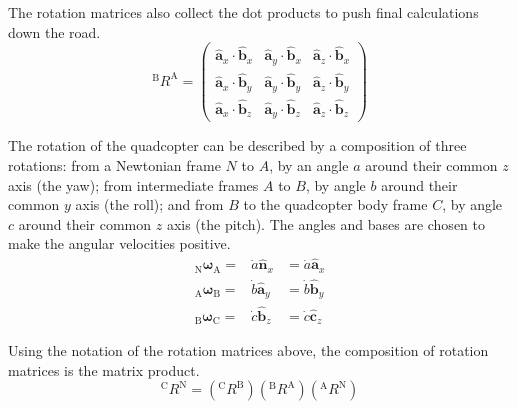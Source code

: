 \documentclass[lettersize,journal]{IEEEtran}
\begin{document}
The rotation matrices also collect the dot products to push final calculations down the road.
\begin{equation}
  {^\mathrm{B}R^\mathrm{A}} = 
  \begin{pmatrix}
    \mathbf{\hat{a}}_x \cdot \mathbf{\hat{b}}_x &
    \mathbf{\hat{a}}_y \cdot \mathbf{\hat{b}}_x &
    \mathbf{\hat{a}}_z \cdot \mathbf{\hat{b}}_x \\
    \mathbf{\hat{a}}_x \cdot \mathbf{\hat{b}}_y &
    \mathbf{\hat{a}}_y \cdot \mathbf{\hat{b}}_y &
    \mathbf{\hat{a}}_z \cdot \mathbf{\hat{b}}_y \\
    \mathbf{\hat{a}}_x \cdot \mathbf{\hat{b}}_z &
    \mathbf{\hat{a}}_y \cdot \mathbf{\hat{b}}_z &
    \mathbf{\hat{a}}_z \cdot \mathbf{\hat{b}}_z
  \end{pmatrix}
\end{equation}

The rotation of the quadcopter can be described by a composition of three rotations: from a Newtonian frame $N$ to $A$, by an angle $a$ around their common $z$ axis (the yaw); from intermediate frames $A$ to $B$, by angle $b$ around their common $y$ axis (the roll); and from $B$ to the quadcopter body frame $C$, by angle $c$ around their common $z$ axis (the pitch). The angles and bases are chosen to make the angular velocities positive.
\begin{eqnarray}
  {_\mathrm{N}\boldsymbol\omega_\mathrm{A}} =& \dot{a} \mathbf{\hat{n}}_x &= \dot{a} \mathbf{\hat{a}}_x\\
  {_\mathrm{A}\boldsymbol\omega_\mathrm{B}} =& \dot{b} \mathbf{\hat{a}}_y &= \dot{b} \mathbf{\hat{b}}_y\\
  {_\mathrm{B}\boldsymbol\omega_\mathrm{C}} =& \dot{c} \mathbf{\hat{b}}_z &= \dot{c} \mathbf{\hat{c}}_z
\end{eqnarray}

Using the notation of the rotation matrices above, the composition of rotation matrices is the matrix product.
\begin{equation}
  {^\mathrm{C}R^\mathrm{N}} = \left({^\mathrm{C}R^\mathrm{B}}\right)\left({^\mathrm{B}R^\mathrm{A}}\right)\left({^\mathrm{A}R^\mathrm{N}}\right)
\end{equation}
\end{document}

